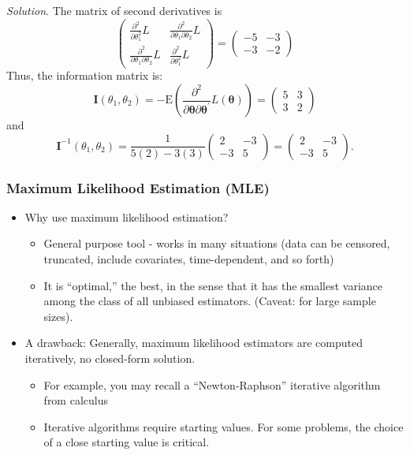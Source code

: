 \documentclass[]{book}
\theoremstyle{definition}
\theoremstyle{definition}
\theoremstyle{definition}
\theoremstyle{remark}
\begin{document}
\emph{Solution}. The matrix of second derivatives is \[\left(
\begin{array}{cc}
  \frac{ \partial ^2}{\partial \theta_1 ^2 } L & \frac{ \partial ^2}{\partial \theta_1 \partial \theta_2 } L  \\
  \frac{ \partial ^2}{\partial \theta_1 \partial \theta_2 } L & \frac{ \partial ^2}{\partial \theta_1 ^2 } L
\end{array} \right) =
\left(
\begin{array}{cc}
  -5 & -3  \\
  -3 & -2
\end{array} \right)\] Thus, the information matrix is:
\[\mathbf{I}(\theta_1, \theta_2) = -\mathrm{E} \left( \frac{ \partial^2}{\partial \boldsymbol \theta
\partial \boldsymbol \theta^{\prime}} L(\boldsymbol \theta) \right) = \left(
\begin{array}{cc}
  5 & 3  \\
  3 & 2
\end{array} \right)\] and
\[\mathbf{I}^{-1}(\theta_1, \theta_2) = \frac{1}{5(2) - 3(3)}\left(
\begin{array}{cc}
  2 & -3  \\
  -3 & 5
\end{array} \right) = \left(
\begin{array}{cc}
  2 & -3  \\
  -3 & 5
\end{array} \right) .\]

\subsubsection{Maximum Likelihood Estimation
(MLE)}\label{maximum-likelihood-estimation-mle}

\begin{itemize}
\item
  Why use maximum likelihood estimation?

  \begin{itemize}
  \item
    General purpose tool - works in many situations (data can be
    censored, truncated, include covariates, time-dependent, and so
    forth)
  \item
    It is ``optimal,'' the best, in the sense that it has the smallest
    variance among the class of all unbiased estimators. (Caveat: for
    large sample sizes).
  \end{itemize}
\item
  A drawback: Generally, maximum likelihood estimators are computed
  iteratively, no closed-form solution.

  \begin{itemize}
  \item
    For example, you may recall a ``Newton-Raphson'' iterative algorithm
    from calculus
  \item
    Iterative algorithms require starting values. For some problems, the
    choice of a close starting value is critical.
  \end{itemize}
\end{itemize}
\end{document}
